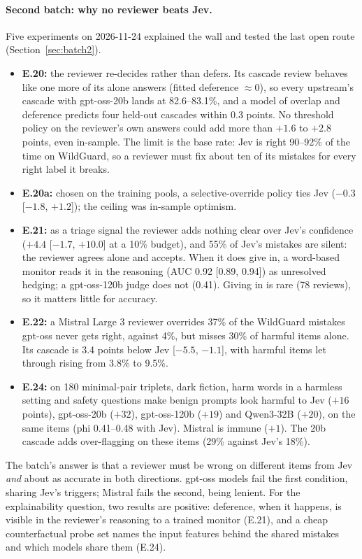 \documentclass[11pt]{article}
\renewcommand{\_}{\origunderscore\allowbreak}
\begin{document}
\paragraph{Second batch: why no reviewer beats Jev.} Five experiments on 2026-11-24 explained the wall and tested the last open route (Section~\ref{sec:batch2}).
\begin{itemize}[leftmargin=*,itemsep=2pt]
  \item \textbf{E.20:} the reviewer re-decides rather than defers. Its cascade review behaves like one more of its alone answers (fitted deference $\approx 0$), so every upstream's cascade with gpt-oss-20b lands at 82.6--83.1\%, and a model of overlap and deference predicts four held-out cascades within 0.3 points. No threshold policy on the reviewer's own answers could add more than $+1.6$ to $+2.8$ points, even in-sample. The limit is the base rate: Jev is right 90--92\% of the time on WildGuard, so a reviewer must fix about ten of its mistakes for every right label it breaks.
  \item \textbf{E.20a:} chosen on the training pools, a selective-override policy ties Jev ($-0.3$ [$-1.8$, $+1.2$]); the ceiling was in-sample optimism.
  \item \textbf{E.21:} as a triage signal the reviewer adds nothing clear over Jev's confidence ($+4.4$ [$-1.7$, $+10.0$] at a 10\% budget), and 55\% of Jev's mistakes are silent: the reviewer agrees alone and accepts. When it does give in, a word-based monitor reads it in the reasoning (AUC 0.92 [0.89, 0.94]) as unresolved hedging; a gpt-oss-120b judge does not (0.41). Giving in is rare (78 reviews), so it matters little for accuracy.
  \item \textbf{E.22:} a Mistral Large 3 reviewer overrides 37\% of the WildGuard mistakes gpt-oss never gets right, against 4\%, but misses 30\% of harmful items alone. Its cascade is 3.4 points below Jev [$-5.5$, $-1.1$], with harmful items let through rising from 3.8\% to 9.5\%.
  \item \textbf{E.24:} on 180 minimal-pair triplets, dark fiction, harm words in a harmless setting and safety questions make benign prompts look harmful to Jev ($+16$ points), gpt-oss-20b ($+32$), gpt-oss-120b ($+19$) and Qwen3-32B ($+20$), on the same items (phi 0.41--0.48 with Jev). Mistral is immune ($+1$). The 20b cascade adds over-flagging on these items (29\% against Jev's 18\%).
\end{itemize}
The batch's answer is that a reviewer must be wrong on different items from Jev \emph{and} about as accurate in both directions. gpt-oss models fail the first condition, sharing Jev's triggers; Mistral fails the second, being lenient. For the explainability question, two results are positive: deference, when it happens, is visible in the reviewer's reasoning to a trained monitor (E.21), and a cheap counterfactual probe set names the input features behind the shared mistakes and which models share them (E.24).
\end{document}
